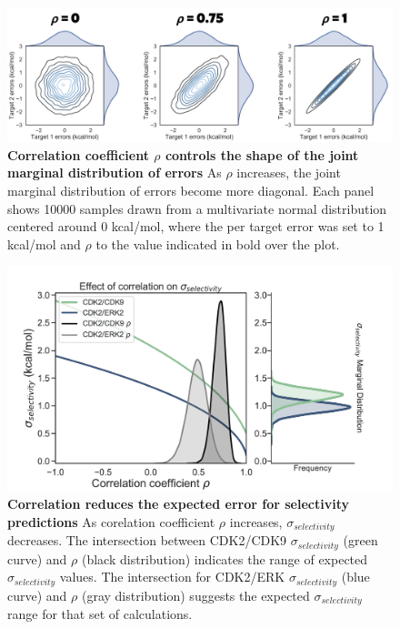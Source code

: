 \documentclass[phd,tocprelim]{cornell}
\begin{document}
\begin{appendices}
	\begin{landscape}
		\begin{figure}[p]
			\centering
			\includegraphics[width=1.0\linewidth]{figures/supp_2.png}
			\caption[ Correlation coefficient $\rho$ controls the shape of the joint marginal distribution of errors]{
				{\bf Correlation coefficient $\rho$ controls the shape of the joint marginal distribution of errors} 
				As $\rho$ increases, the joint marginal distribution of errors become more diagonal. Each panel shows 10000 samples drawn from a multivariate normal distribution centered around 0 kcal/mol, where the per target error was set to 1 kcal/mol and $\rho$ to the value indicated in bold over the plot. 
			}
			\label{fig:sup-figure-2}
		\end{figure}
	\end{landscape}
	
	\begin{landscape}
		\begin{figure}[p]
			\centering
			\includegraphics[width=0.8\linewidth]{figures/supp_figure3.pdf}
			\caption[Correlation reduces the expected error for selectivity predictions]{
				{\bf Correlation reduces the expected error for selectivity predictions}
				As corelation coefficient $\rho$ increases, $\sigma_{selectivity}$ decreases. The intersection between CDK2/CDK9 $\sigma_{selectivity}$ (green curve) and $\rho$ (black distribution) indicates the range of expected $\sigma_{selectivity}$ values. The intersection for CDK2/ERK $\sigma_{selectivity}$ (blue curve) and $\rho$ (gray distribution) suggests the expected $\sigma_{selectivity}$ range for that set of calculations. 
			}
			\label{fig:sup-figure-3}
		\end{figure}
	\end{landscape}
	

\end{appendices}
\end{document}
